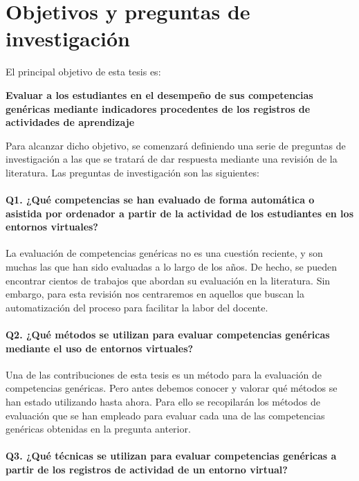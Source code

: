 
\section{Objetivos y preguntas de investigación}
\label{sec:objetivos}

El principal objetivo de esta tesis es:

\bigskip
\textbf{Evaluar a los estudiantes en el desempeño de sus competencias genéricas mediante indicadores procedentes de los registros de actividades de aprendizaje}
\bigskip

Para alcanzar dicho objetivo, se comenzará definiendo una serie de preguntas de investigación a las que se tratará de dar respuesta mediante una revisión de la literatura. Las preguntas de investigación son las siguientes:

\paragraph*{Q1. ¿Qué competencias se han evaluado de forma automática o asistida por ordenador a partir de la actividad de los estudiantes en los entornos virtuales?}

La evaluación de competencias genéricas no es una cuestión reciente, y son muchas las que han sido evaluadas a lo largo de los años. De hecho, se pueden encontrar cientos de trabajos que abordan su evaluación en la literatura. Sin embargo, para esta revisión nos centraremos en aquellos que buscan la automatización del proceso para facilitar la labor del docente.

\paragraph*{Q2. ¿Qué métodos se utilizan para evaluar competencias genéricas mediante el uso de entornos virtuales?}

Una de las contribuciones de esta tesis es un método para la evaluación de competencias genéricas. Pero antes debemos conocer y valorar qué métodos se han estado utilizando hasta ahora. Para ello se recopilarán los métodos de evaluación que se han empleado para evaluar cada una de las competencias genéricas obtenidas en la pregunta anterior.

\paragraph*{Q3. ¿Qué técnicas se utilizan para evaluar competencias genéricas a partir de los registros de actividad de un entorno virtual?}


